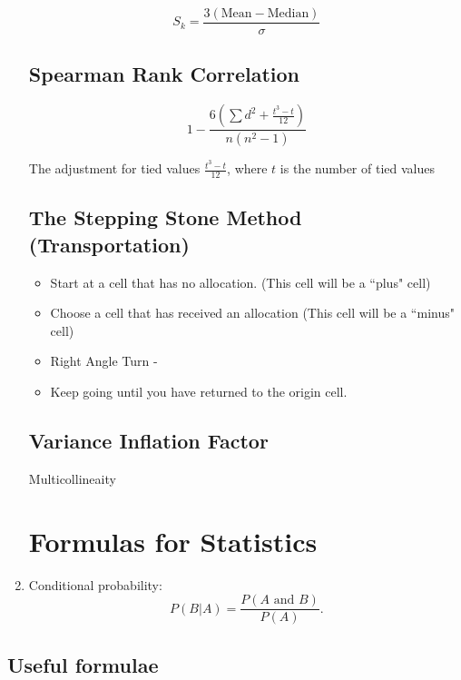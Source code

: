 \begin{enumerate}
\[S_k = \frac{3(\mbox{Mean} - \mbox{Median} )}{\sigma} \]




\section{Spearman Rank Correlation}

\[ 1 - \frac{6\left( \sum d^2 + \frac{t^3-t}{12} \right)}{n(n^2-1)} \]

The adjustment for tied values
$ \frac{t^3-t}{12} $, where $t$ is the number of tied values


\section{The Stepping Stone Method (Transportation)}

\begin{itemize}
	\item Start at a cell that has no allocation. (This cell will be a ``plus" cell)
	\item Choose a cell that has received an allocation (This cell will be a ``minus" cell)
	\item Right Angle Turn -
	\item Keep going until you have returned to the origin cell.
\end{itemize}

\section{Variance Inflation Factor}

Multicollineaity

\chapter{Formulas for Statistics}


	
	\item Conditional probability:
	\begin{equation*}
	P(B|A)=\frac{P\left( A\text{ and }B\right) }{P\left( A\right) }.
	\end{equation*}
\end{enumerate}	

\section{Useful formulae}

